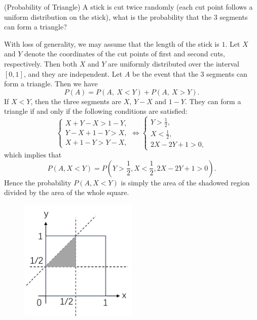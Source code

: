 \documentclass[12pt,letterpaper, onecolumn]{exam}
\begin{document}
\begin{questions}
        \question[](Probability of Triangle) A stick is cut twice randomly (each cut point follows a uniform distribution on the stick), what is the probability that the $3$ segments can form a triangle?
        \begin{solution}
            With loss of generality, we may assume that the length of the stick is $1$. Let $X$ and $Y$ denote the coordinates of the cut points of first and second cuts, respectively. Then both $X$ and $Y$ are uniformly distributed over the interval $[0,1]$, and they are independent. Let $A$ be the event that the $3$ segments can form a triangle. Then we have 
            $$P(A)=P(A,\ X<Y)+P(A,\ X>Y).$$
            \quad If $X<Y$, then the three segments are $X$, $Y-X$ and $1-Y$. They can form a triangle if and only if the following conditions are satisfied:
            \begin{equation*}
               \begin{cases}
                     X+Y-X>1-Y,\\
                     Y-X+1-Y>X,\\
                     X+1-Y>Y-X,
               \end{cases}\Leftrightarrow\begin{cases}
                     Y>\frac{1}{2},\\
                     X<\frac{1}{2},\\
                     2X-2Y+1>0,
               \end{cases}
            \end{equation*}
            which implies that
            $$P(A,X<Y)=P(Y>\frac{1}{2},X<\frac{1}{2},2X-2Y+1>0).$$
            Hence the probability $P(A,X<Y)$ is simply the area of the shadowed region divided by the area of the whole square. 
            \begin{figure}[H]
                \centering
                \includegraphics[width=0.5\textwidth]{figures/fig-2.png} %

\end{figure}
\end{solution}
\end{questions}
\end{document}

